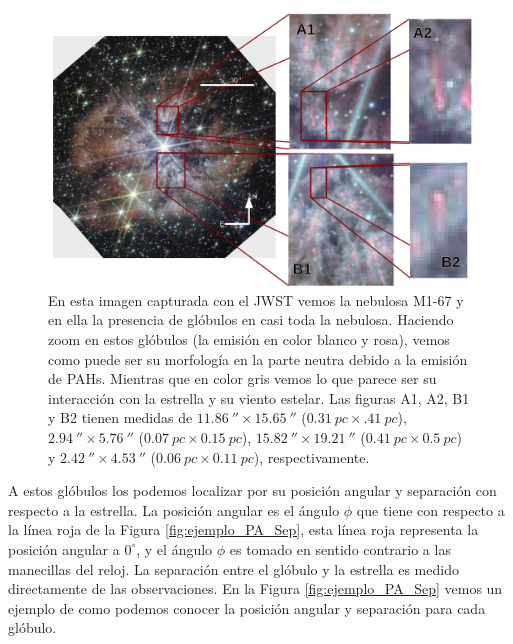 \documentclass{book}
\begin{document}
\begin{figure}[htb]
    \centering
    \includegraphics[width=\textwidth]{ultimas correcciones/WR124_glo_ej.pdf}
    \caption{En esta imagen capturada con el JWST vemos la nebulosa M1-67 y en ella la presencia de glóbulos en casi toda la nebulosa. Haciendo zoom en estos glóbulos (la emisión en color blanco y rosa), vemos como puede ser su morfología en la parte neutra debido a la emisión de PAHs. Mientras que en color gris vemos lo que parece ser su interacción con la estrella y su viento estelar. Las figuras A1, A2, B1 y B2 tienen medidas de $\SI{11.86}{\arcsecond}\times\SI{15.65}{\arcsecond}$ ($\SI{0.31}{pc}\times\SI{.41}{pc}$), $\SI{2.94}{\arcsecond}\times\SI{5.76}{\arcsecond}$ ($\SI{0.07}{pc}\times\SI{0.15}{pc}$), $\SI{15.82}{\arcsecond}\times\SI{19.21}{\arcsecond}$ ($\SI{0.41}{pc}\times\SI{0.5}{pc}$) y $\SI{2.42}{\arcsecond}\times\SI{4.53}{\arcsecond}$ ($\SI{0.06}{pc}\times\SI{0.11}{pc}$), respectivamente.}
    \label{fig:nudos WR124}
\end{figure}

A estos glóbulos los podemos localizar por su posición angular y separación con respecto a la estrella. La posición angular es el ángulo $\phi$ que tiene con respecto a la línea roja de la Figura \ref{fig:ejemplo_PA_Sep}, esta línea roja representa la posición angular a $0^\circ$, y el ángulo $\phi$ es tomado en sentido contrario a las manecillas del reloj. La separación entre el glóbulo y la estrella es medido directamente de las observaciones. En la Figura \ref{fig:ejemplo_PA_Sep} vemos un ejemplo de como podemos conocer la posición angular y separación para cada glóbulo.
\end{document}
